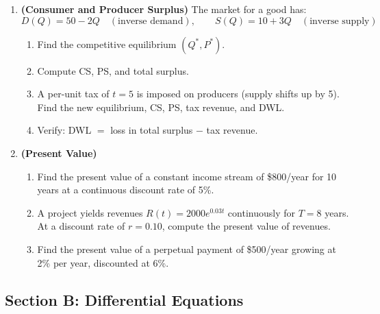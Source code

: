 \documentclass[12pt, a4paper]{article}
\theoremstyle{definition}
\begin{document}
\begin{enumerate}[label=\textbf{A\arabic*.},leftmargin=2.5em]
\item \textbf{(Consumer and Producer Surplus)} The market for a good has:
\[
  D(Q) = 50 - 2Q \quad (\text{inverse demand}), \qquad
  S(Q) = 10 + 3Q \quad (\text{inverse supply})
\]
\begin{enumerate}[label=(\alph*)]
  \item Find the competitive equilibrium $(Q^*,P^*)$.
  \item Compute CS, PS, and total surplus.
  \item A per-unit tax of $t=5$ is imposed on producers (supply shifts
        up by 5). Find the new equilibrium, CS, PS, tax revenue, and DWL.
  \item Verify: DWL $=$ loss in total surplus $-$ tax revenue.
\end{enumerate}
\newpage
\item \textbf{(Present Value)}
\begin{enumerate}[label=(\alph*)]
  \item Find the present value of a constant income stream of \$800/year
        for 10 years at a continuous discount rate of 5\%.
  \item A project yields revenues $R(t)=2000e^{0.03t}$ continuously for
        $T=8$ years. At a discount rate of $r=0.10$, compute the present
        value of revenues.
  \item Find the present value of a perpetual payment of \$500/year
        growing at 2\% per year, discounted at 6\%.
\end{enumerate}

\end{enumerate}

\subsection{Section B: Differential Equations}
\end{document}
